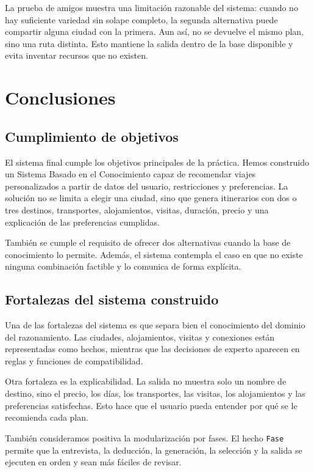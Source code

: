 \documentclass[11pt,a4paper]{article}
\begin{document}
La prueba de amigos muestra una limitaci\'on razonable del sistema: cuando no
hay suficiente variedad sin solape completo, la segunda alternativa puede
compartir alguna ciudad con la primera. Aun as\'i, no se devuelve el mismo plan,
sino una ruta distinta. Esto mantiene la salida dentro de la base disponible y
evita inventar recursos que no existen.

\section{Conclusiones}
\subsection{Cumplimiento de objetivos}
El sistema final cumple los objetivos principales de la pr\'actica. Hemos
construido un Sistema Basado en el Conocimiento capaz de recomendar viajes
personalizados a partir de datos del usuario, restricciones y preferencias. La
soluci\'on no se limita a elegir una ciudad, sino que genera itinerarios con dos
o tres destinos, transportes, alojamientos, visitas, duraci\'on, precio y una
explicaci\'on de las preferencias cumplidas.

Tambi\'en se cumple el requisito de ofrecer dos alternativas cuando la base de
conocimiento lo permite. Adem\'as, el sistema contempla el caso en que no existe
ninguna combinaci\'on factible y lo comunica de forma expl\'icita.

\subsection{Fortalezas del sistema construido}
Una de las fortalezas del sistema es que separa bien el conocimiento del dominio
del razonamiento. Las ciudades, alojamientos, visitas y conexiones est\'an
representadas como hechos, mientras que las decisiones de experto aparecen en
reglas y funciones de compatibilidad.

Otra fortaleza es la explicabilidad. La salida no muestra solo un nombre de
destino, sino el precio, los d\'ias, los transportes, las visitas, los
alojamientos y las preferencias satisfechas. Esto hace que el usuario pueda
entender por qu\'e se le recomienda cada plan.

Tambi\'en consideramos positiva la modularizaci\'on por fases. El hecho
\texttt{Fase} permite que la entrevista, la deducci\'on, la generaci\'on, la
selecci\'on y la salida se ejecuten en orden y sean m\'as f\'aciles de revisar.
\end{document}

